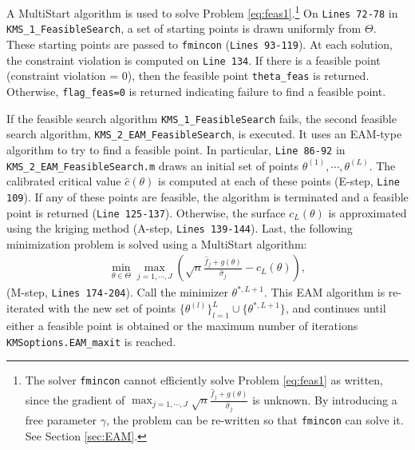 \documentclass[12pt]{article}
\def\code#1{\texttt{#1}}
\begin{document}
A MultiStart algorithm is used to solve Problem \eqref{eq:feas1}.\footnote{The solver \code{fmincon} cannot efficiently solve Problem \eqref{eq:feas1} as written, since the gradient of $ \max_{j=1,\cdots,J}\sqrt{n} \frac{\hat f_j + g(\theta)}{\hat \sigma_j}$ is unknown.  By introducing a free parameter $\gamma$, the problem can be re-written so that \code{fmincon} can solve it.  See Section \ref{sec:EAM}.}   On \code{Lines 72-78} in \code{KMS\_1\_Feasible\-Search}, a set of starting points is drawn uniformly from $\Theta$.  These starting points are passed to \code{fmincon} (\code{Lines 93-119}).  At each solution, the constraint violation is computed on \code{Line 134}.  If there is a feasible point (constraint violation = 0), then the feasible point \code{theta\_feas} is returned.  Otherwise, \code{flag\_feas=0} is returned indicating failure to find a feasible point.

If the feasible search algorithm \code{KMS\_1\_FeasibleSearch} fails, the second feasible search algorithm, \code{KMS\_2\_EAM\_FeasibleSearch}, is executed.  It uses an EAM-type algorithm to try to find a feasible point.  In particular, \code{Line 86-92} in \code{KMS\_2\_EAM\_FeasibleSearch.m} draws an initial set of points $\theta^{(1)},\cdots,\theta^{(L)}$.  The calibrated critical value $\hat c(\theta)$ is computed at each of these points (E-step, \code{Line 109}).  If any of these points are feasible, the algorithm is terminated and a feasible point is returned (\code{Line 125-137}).  Otherwise, the surface $c_L(\theta)$ is approximated using the kriging method (A-step, \code{Lines 139-144}).  Last, the following minimization problem is solved using a MultiStart algorithm:
\begin{align}\label{eq:feas2}
\min_{\theta \in \Theta} \max_{j=1,\cdots,J} \left( \sqrt{n} \frac{\hat f_j + g(\theta)}{\hat \sigma_j} - c_L(\theta)\right),
\end{align}
(M-step, \code{Lines 174-204}).  Call the minimizer $\theta^{*,L+1}$.  This EAM algorithm is re-iterated with the new set of points $\{\theta^{(l)}\}_{l=1}^L\cup \{\theta^{*,L+1}\}$, and continues until either a feasible point is obtained or the maximum number of iterations \code{KMSoptions.EAM\_maxit} is reached.
\end{document}
